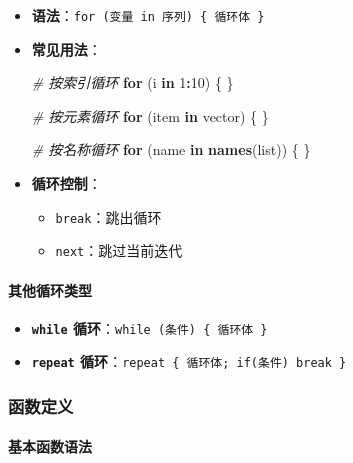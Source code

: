 \documentclass[
  twoside]{book}
\newenvironment{Shaded}{\begin{snugshade}}{\end{snugshade}}
\newcommand{\CommentTok}[1]{\textcolor[rgb]{0.56,0.35,0.01}{\textit{#1}}}
\newcommand{\ControlFlowTok}[1]{\textcolor[rgb]{0.13,0.29,0.53}{\textbf{#1}}}
\newcommand{\DecValTok}[1]{\textcolor[rgb]{0.00,0.00,0.81}{#1}}
\newcommand{\FunctionTok}[1]{\textcolor[rgb]{0.13,0.29,0.53}{\textbf{#1}}}
\newcommand{\NormalTok}[1]{#1}
\newcommand{\SpecialCharTok}[1]{\textcolor[rgb]{0.81,0.36,0.00}{\textbf{#1}}}
\providecommand{\tightlist}{%
  \setlength{\itemsep}{0pt}\setlength{\parskip}{0pt}}
\begin{document}
\begin{itemize}
\item
  \textbf{语法}：\texttt{for\ (变量\ in\ 序列)\ \{\ 循环体\ \}}
\item
  \textbf{常见用法}：

\begin{Shaded}
\begin{Highlighting}[]
\CommentTok{\# 按索引循环}
\ControlFlowTok{for}\NormalTok{ (i }\ControlFlowTok{in} \DecValTok{1}\SpecialCharTok{:}\DecValTok{10}\NormalTok{) \{ \}}

\CommentTok{\# 按元素循环}
\ControlFlowTok{for}\NormalTok{ (item }\ControlFlowTok{in}\NormalTok{ vector) \{ \}}

\CommentTok{\# 按名称循环}
\ControlFlowTok{for}\NormalTok{ (name }\ControlFlowTok{in} \FunctionTok{names}\NormalTok{(list)) \{ \}}
\end{Highlighting}
\end{Shaded}
\item
  \textbf{循环控制}：

  \begin{itemize}
  \tightlist
  \item
    \texttt{break}：跳出循环
  \item
    \texttt{next}：跳过当前迭代
  \end{itemize}
\end{itemize}

\hypertarget{ux5176ux4ed6ux5faaux73afux7c7bux578b}{%
\paragraph{其他循环类型}\label{ux5176ux4ed6ux5faaux73afux7c7bux578b}}

\begin{itemize}
\tightlist
\item
  \textbf{\texttt{while} 循环}：\texttt{while\ (条件)\ \{\ 循环体\ \}}
\item
  \textbf{\texttt{repeat} 循环}：\texttt{repeat\ \{\ 循环体;\ if(条件)\ break\ \}}
\end{itemize}

\hypertarget{ux51fdux6570ux5b9aux4e49}{%
\subsubsection{函数定义}\label{ux51fdux6570ux5b9aux4e49}}

\hypertarget{ux57faux672cux51fdux6570ux8bedux6cd5}{%
\paragraph{基本函数语法}\label{ux57faux672cux51fdux6570ux8bedux6cd5}}
\end{document}

